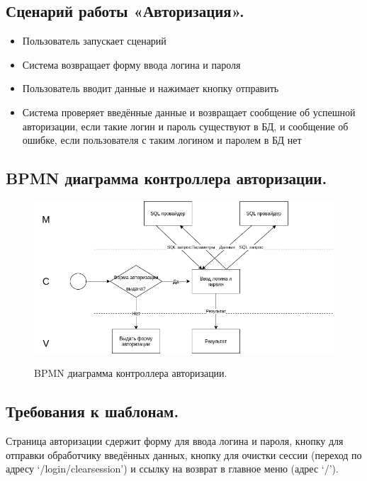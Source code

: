 \documentclass[12pt, a4paper]{article}
\begin{document}
	\subsection{Сценарий работы «Авторизация».}
	\begin{itemize}
		\item Пользователь запускает сценарий
		\item Система возвращает форму ввода логина и пароля
		\item Пользователь вводит данные и нажимает кнопку отправить
		\item {Система проверяет введённые данные и возвращает сообщение об успешной
		       авторизации, если такие логин и пароль существуют в БД, и сообщение об ошибке,
	      	   если пользователя с таким логином и паролем в БД нет}
	\end{itemize}

    \subsection{BPMN диаграмма контроллера авторизации.}
    \begin{figure}[h]
    	\centering    %
    	\includegraphics[width=1\textwidth]{pictures/BPMN_auth.png}
    	\label{fig:pic7} %
    	\caption{BPMN диаграмма контроллера авторизации.}
    \end{figure}

    \subsection{Требования к шаблонам.}
    Страница авторизации сдержит форму для ввода логина и пароля, кнопку для отправки
    обработчику введённых данных, кнопку для очистки сессии (переход по адресу ‘/login/clearsession’) и ссылку на возврат в главное меню (адрес ‘/’).
    
\end{document}
